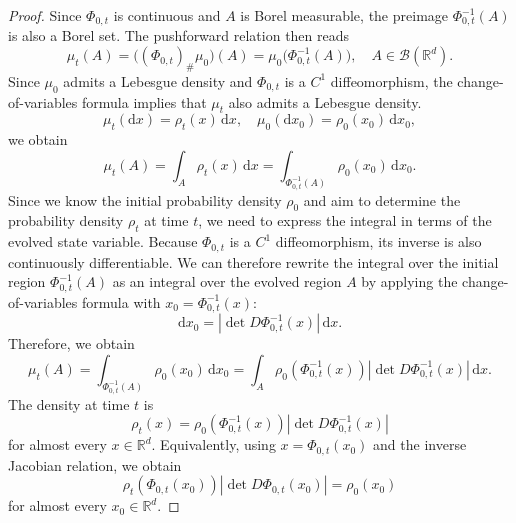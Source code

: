 \documentclass[12pt,a4paper,oneside]{book}
\begin{document}
\begin{proof}
Since $\Phi_{0,t}$ is continuous and $A$ is Borel measurable, the preimage $\Phi_{0,t}^{-1}(A)$ is also a Borel set. The
pushforward relation then reads
\begin{equation*}
    \mu_t(A) 
    = \bigl((\Phi_{0,t})_{\#}\mu_0\bigr)(A) 
    = \mu_0\bigl(\Phi_{0,t}^{-1}(A)\bigr), 
    \quad A\in\mathcal B(\mathbb R^d).
\end{equation*}
Since $\mu_0$ admits a Lebesgue density and $\Phi_{0,t}$ is a $C^1$ diffeomorphism, the change-of-variables formula implies 
that $\mu_t$ also admits a Lebesgue density.
\begin{equation*}
    \mu_t(\mathrm dx)=\rho_t(x)\,\mathrm dx, \quad
    \mu_0(\mathrm dx_0)=\rho_0(x_0)\,\mathrm dx_0,
\end{equation*}
we obtain
\begin{equation*}
    \mu_t(A) = \int_A\rho_t(x)\,\mathrm dx = \int_{\Phi_{0,t}^{-1}(A)}\rho_0(x_0)\,\mathrm dx_0.
\end{equation*}
Since we know the initial probability density $\rho_0$ and aim to determine the probability density $\rho_t$ at time $t$, 
we need to express the integral in terms of the evolved state variable. Because $\Phi_{0,t}$ is a $C^1$ diffeomorphism,
its inverse is also continuously differentiable. We can therefore rewrite the integral over the initial region $\Phi_{0,t}^{-1}(A)$ 
as an integral over the evolved region $A$ by applying the change-of-variables formula with $x_0=\Phi_{0,t}^{-1}(x)$:
\begin{equation*}
    \mathrm dx_0 = \left|\det D\Phi_{0,t}^{-1}(x)\right|\,\mathrm dx.
\end{equation*}
Therefore, we obtain
\begin{equation*}
    \mu_t(A) 
    = \int_{\Phi_{0,t}^{-1}(A)}\rho_0(x_0)\,\mathrm dx_0
    = \int_A \rho_0(\Phi_{0,t}^{-1}(x)) \left|\det D\Phi_{0,t}^{-1}(x)\right|\,\mathrm dx.
\end{equation*}
The density at time $t$ is
\begin{equation*}
    \rho_t(x) = \rho_0(\Phi_{0,t}^{-1}(x))\left|\det D\Phi_{0,t}^{-1}(x)\right|
\end{equation*}
for almost every $x\in\mathbb R^d$. Equivalently, using $x=\Phi_{0,t}(x_0)$ and the inverse Jacobian relation, we obtain
\begin{equation*}
    \rho_t(\Phi_{0,t}(x_0)) \left|\det D\Phi_{0,t}(x_0)\right| = \rho_0(x_0)
\end{equation*}
for almost every $x_0\in\mathbb R^d$.


\end{proof}
\end{document}
